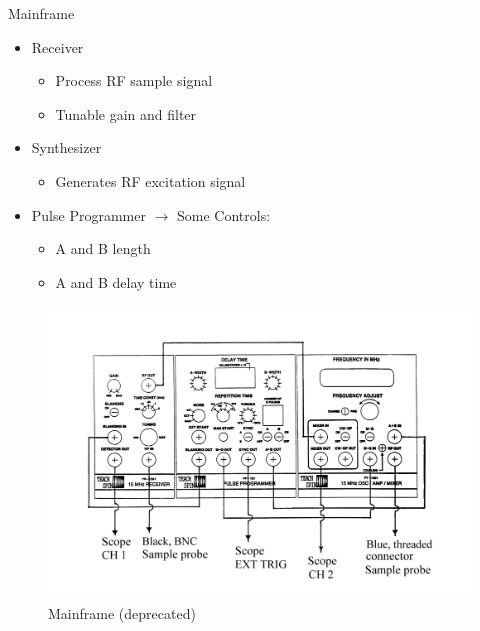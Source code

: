 \documentclass[aspectratio=169,xcolor=dvipsnames]{beamer}
\begin{document}
\begin{frame}{Mainframe}
    \begin{minipage}{0.4\linewidth}
        \begin{itemize}
            \item Receiver
            \begin{itemize}
                \item Process RF sample signal 
                \item Tunable gain and filter
            \end{itemize}
            \item Synthesizer
            \begin{itemize}
                \item Generates RF excitation signal 
            \end{itemize}
            \item Pulse Programmer $\rightarrow$ Some Controls: 
            \begin{itemize}
                \item A and B length
                \item A and B delay time
            \end{itemize} 
        \end{itemize}
    \end{minipage}
    \hfill
    \begin{minipage}{0.5\linewidth}
        \begin{figure}
            \centering
            \includegraphics[width = 0.9\linewidth]{figs/mainframe.png}
            \caption{Mainframe (deprecated)}
        \end{figure}
    \end{minipage}
\end{frame}
\end{document}
